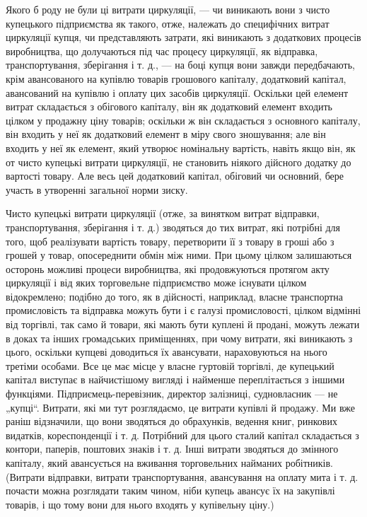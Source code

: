 Якого б роду не були ці витрати циркуляції, — чи виникають
вони з чисто купецького підприємства як такого, отже, належать
до специфічних витрат циркуляції купця, чи представляють
затрати, які виникають з додаткових процесів виробництва, що
долучаються під час процесу циркуляції, як відправка, транспортування,
зберігання і т. д., — на боці купця вони завжди передбачають,
крім авансованого на купівлю товарів грошового капіталу,
додатковий капітал, авансований на купівлю і оплату цих
засобів циркуляції. Оскільки цей елемент витрат складається
з обігового капіталу, він як додатковий елемент входить цілком
у продажну ціну товарів; оскільки ж він складається з основного
капіталу, він входить у неї як додатковий елемент в міру
свого зношування; але він входить у неї як елемент, який утворює
номінальну вартість, навіть якщо він, як от чисто купецькі
витрати циркуляції, не становить ніякого дійсного додатку до
вартості товару. Але весь цей додатковий капітал, обіговий
чи основний, бере участь в утворенні загальної норми зиску.

Чисто купецькі витрати циркуляції (отже, за винятком витрат
відправки, транспортування, зберігання і т. д.) зводяться до тих
витрат, які потрібні для того, щоб реалізувати вартість товару,
перетворити її з товару в гроші або з грошей у товар, опосереднити
обмін між ними. При цьому цілком залишаються осторонь
можливі процеси виробництва, які продовжуються протягом
акту циркуляції і від яких торговельне підприємство може
існувати цілком відокремлено; подібно до того, як в дійсності,
наприклад, власне транспортна промисловість та відправка можуть
бути і є галузі промисловості, цілком відмінні від торгівлі,
так само й товари, які мають бути куплені й продані,
можуть лежати в доках та інших громадських приміщеннях, при
чому витрати, які виникають з цього, оскільки купцеві доводиться
їх авансувати, нараховуються на нього третіми особами.
Все це має місце у власне гуртовій торгівлі, де купецький
капітал виступає в найчистішому вигляді і найменше переплітається
з іншими функціями. Підприємець-перевізник, директор
залізниці, судновласник — не „купці“. Витрати, які ми тут розглядаємо,
це витрати купівлі й продажу. Ми вже раніш відзначили,
що вони зводяться до обрахунків, ведення книг, ринкових
видатків, кореспонденції і т. д. Потрібний для цього сталий
капітал складається з контори, паперів, поштових знаків
і т. д. Інші витрати зводяться до змінного капіталу, який авансується
на вживання торговельних найманих робітників. (Витрати
відправки, витрати транспортування, авансування на оплату
мита і т. д. почасти можна розглядати таким чином, ніби купець
авансує їх на закупівлі товарів, і що тому вони для нього входять
у купівельну ціну.)

